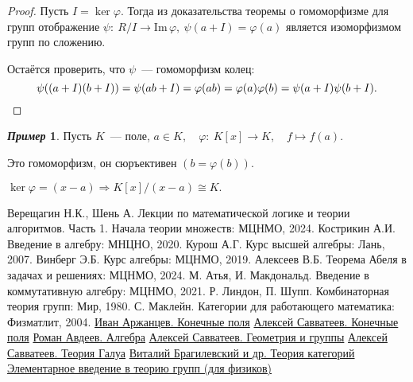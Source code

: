 \documentclass[a4paper, 14pt]{extarticle}
\newcommand{\n}{\par}
\newcommand{\im}{\mathrm{Im} \,}
\renewcommand{\phi}{\varphi}
\theoremstyle{definition}
\newtheorem*{exmpl*}{\textit{Пример}}
\theoremstyle{plain}
\numberwithin{theorem}{section}
\numberwithin{definition}{section}
\numberwithin{statement}{section}
\numberwithin{lemma}{section}
\numberwithin{consequence}{section}
\begin{document}
	\begin{proof}
		Пусть ${I = \ker \phi.}$ Тогда из доказательства теоремы о гомоморфизме для групп отображение ${\psi{:} \ R/I \rightarrow \im \phi, \ \psi(a + I) = \phi(a)}$ является изоморфизмом групп по сложению.\n
		Остаётся проверить, что $\psi$~--- гомоморфизм колец:
		\begin{equation*}
			\psi((a + I)(b + I)) = \psi(ab + I) = \phi(ab) = \phi(a)\phi(b) = \psi(a + I)\psi(b + I). \qedhere
		\end{equation*}
	\end{proof}
	\begin{exmpl*}
		Пусть $K$~--- поле, ${a \in K, \quad \phi{:} \ K[x] \rightarrow K, \quad f \mapsto f(a).}$ \n
		Это гомоморфизм, он сюръективен ${(b = \phi(b)).}$ \n
		$\ker \phi = (x - a) \Longrightarrow K[x]/(x - a) \cong K.$
	\end{exmpl*}
	\newpage
	\begin{thebibliography}{99}
		 Верещагин Н.К., Шень А.
		Лекции по математической логике и теории алгоритмов. Часть 1. Начала теории множеств: МЦНМО, 2024.
		 Кострикин А.И. Введение в алгебру: МНЦНО, 2020.
		 Курош А.Г. Курс высшей алгебры: Лань, 2007.
		 Винберг Э.Б. Курс алгебры: МЦНМО, 2019.
		 Алексеев В.Б. Теорема Абеля в задачах и решениях: МЦНМО, 2024.
		 М. Атья, И. Макдональд. Введение в коммутативную алгебру: МЦНМО, 2021.
		 Р. Линдон, П. Шупп. Комбинаторная теория групп: Мир, 1980.
		 С. Маклейн. Категории для работающего математика: Физматлит, 2004.
		 \href{https://www.youtube.com/watch?v=9PTiaQODKiA}{Иван Аржанцев. Конечные поля}
		 \href{https://youtube.com/playlist?list=PLH3NNipqeM1vcHnP4czWemq5DyBw9MXxn&si=UFBR6POWzySgFqPt}{Алексей Савватеев. Конечные поля}
		 \href{https://youtube.com/playlist?list=PLEwK9wdS5g0pxQ2ThGS3ObFwm4h1Ll0Kr&si=AM33kfEJxKFqNR-k}{Роман Авдеев. Алгебра}
		 \href{https://youtube.com/playlist?list=PLlx2izuC9gjgZsBALx2ZF7IMGoNl07A9l&si=9X5Oosl5a53UTlTb}{Алексей Савватеев. Геометрия и группы}
		 \href{https://youtube.com/playlist?list=PLgEpoT7yAl9VWebUfw4uOlut1ZaoFjFcb&si=yM6DjTk5Cenofg5U}{Алексей Савватеев. Теория Галуа}
		 \href{https://youtube.com/playlist?list=PLvPsfYrGz3wsX3Z5KuuEVYhijDxhKCDDD&si=eh_MI9GO0mYzxZMU}{Виталий Брагилевский и др. Теория категорий}
		 \href{https://youtube.com/playlist?list=PLnbH8YQPwKblIpRi0ARO2VadnMwntvF51&si=qXQx9-xB7_arfxB8}{Элементарное введение в теорию групп (для физиков)}
	\end{thebibliography}
\end{document}
